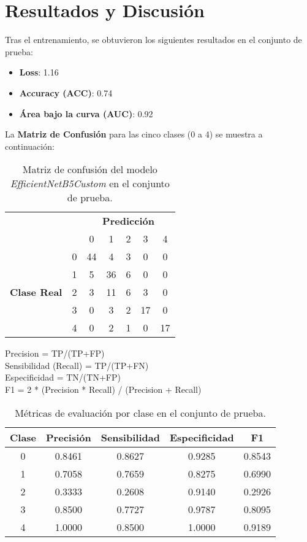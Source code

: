 \documentclass[11pt,spanish,listoffigures,listoftables]{tfgetsinf}
\begin{document}
\section{Resultados y Discusión}
Tras el entrenamiento, se obtuvieron los siguientes resultados en el conjunto de prueba:
\begin{itemize}
    \item \textbf{Loss}: 1.16
    \item \textbf{Accuracy (ACC)}: 0.74
    \item \textbf{Área bajo la curva (AUC)}: 0.92
\end{itemize}

La \textbf{Matriz de Confusión} para las cinco clases (0 a 4) se muestra a continuación:

\begin{table}[h]
\centering
\begin{tabular}{cc|ccccc}
    & \multicolumn{1}{c}{} & \multicolumn{5}{c}{\textbf{Predicción}} \\ 
    & \multicolumn{1}{c}{} & 0 & 1 & 2 & 3 & 4 \\ \cline{3-7}
\multirow{5}{*}{\textbf{Clase Real}}    
& 0 & 44 & 4  & 3 & 0  & 0 \\
& 1 & 5  & 36 & 6 & 0  & 0 \\
& 2 & 3  & 11 & 6 & 3  & 0 \\
& 3 & 0  & 3  & 2 & 17 & 0 \\
& 4 & 0  & 2  & 1 & 0  & 17 \\
\end{tabular}
\caption{Matriz de confusión del modelo \textit{EfficientNetB5Custom} en el conjunto de prueba.}
\end{table}

Precision = TP/(TP+FP) \\
Sensibilidad (Recall) = TP/(TP+FN) \\
Especificidad = TN/(TN+FP) \\
F1 = 2 * (Precision * Recall) / (Precision + Recall) \\

\begin{table}[h]
\centering
\begin{tabular}{c|cccc}
\hline
\textbf{Clase} & \textbf{Precisión} & \textbf{Sensibilidad} & \textbf{Especificidad} & \textbf{F1} \\
\hline
0 & 0.8461 & 0.8627 & 0.9285 & 0.8543 \\
1 & 0.7058 & 0.7659 & 0.8275 & 0.6990 \\
2 & 0.3333 & 0.2608 & 0.9140 & 0.2926 \\
3 & 0.8500 & 0.7727 & 0.9787 & 0.8095 \\
4 & 1.0000 & 0.8500 & 1.0000 & 0.9189 \\
\hline
\end{tabular}
\caption{Métricas de evaluación por clase en el conjunto de prueba.}
\label{tab:metricas-clase}
\end{table}
\end{document}
